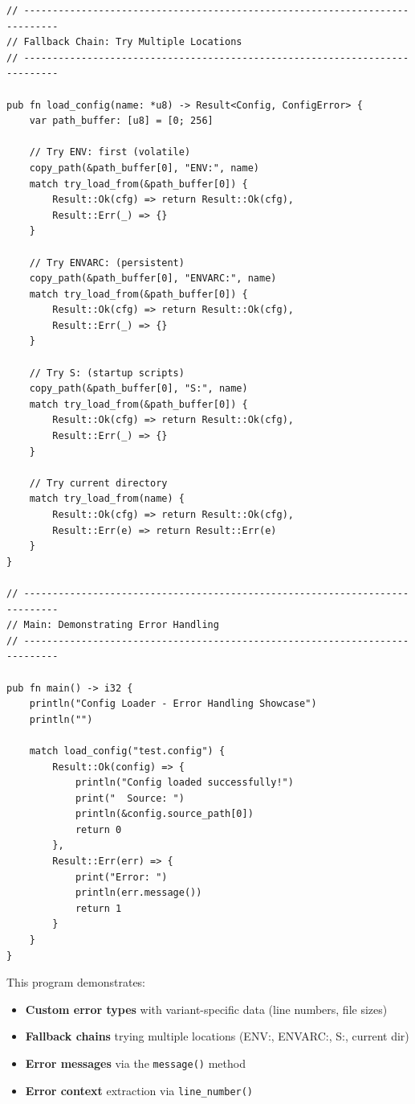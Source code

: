 \begin{lstlisting}
// ----------------------------------------------------------------------------
// Fallback Chain: Try Multiple Locations
// ----------------------------------------------------------------------------

pub fn load_config(name: *u8) -> Result<Config, ConfigError> {
    var path_buffer: [u8] = [0; 256]

    // Try ENV: first (volatile)
    copy_path(&path_buffer[0], "ENV:", name)
    match try_load_from(&path_buffer[0]) {
        Result::Ok(cfg) => return Result::Ok(cfg),
        Result::Err(_) => {}
    }

    // Try ENVARC: (persistent)
    copy_path(&path_buffer[0], "ENVARC:", name)
    match try_load_from(&path_buffer[0]) {
        Result::Ok(cfg) => return Result::Ok(cfg),
        Result::Err(_) => {}
    }

    // Try S: (startup scripts)
    copy_path(&path_buffer[0], "S:", name)
    match try_load_from(&path_buffer[0]) {
        Result::Ok(cfg) => return Result::Ok(cfg),
        Result::Err(_) => {}
    }

    // Try current directory
    match try_load_from(name) {
        Result::Ok(cfg) => return Result::Ok(cfg),
        Result::Err(e) => return Result::Err(e)
    }
}

// ----------------------------------------------------------------------------
// Main: Demonstrating Error Handling
// ----------------------------------------------------------------------------

pub fn main() -> i32 {
    println("Config Loader - Error Handling Showcase")
    println("")

    match load_config("test.config") {
        Result::Ok(config) => {
            println("Config loaded successfully!")
            print("  Source: ")
            println(&config.source_path[0])
            return 0
        },
        Result::Err(err) => {
            print("Error: ")
            println(err.message())
            return 1
        }
    }
}
\end{lstlisting}

This program demonstrates:
\begin{itemize}
    \item \textbf{Custom error types} with variant-specific data (line numbers, file sizes)
    \item \textbf{Fallback chains} trying multiple locations (ENV:, ENVARC:, S:, current dir)
    \item \textbf{Error messages} via the \texttt{message()} method
    \item \textbf{Error context} extraction via \texttt{line\_number()}
\end{itemize}

